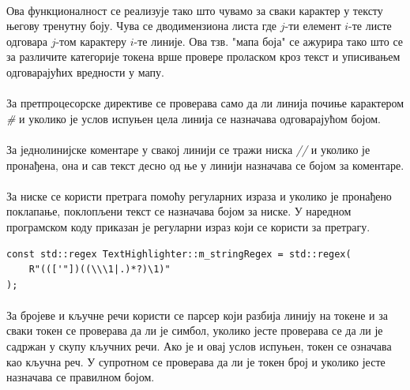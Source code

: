 \documentclass[12pt,oneside]{memoir}
\begin{document}
\paragraph{}
Ова функционалност се реализује тако што чувамо за сваки карактер у тексту његову тренутну боју. Чува се дводимензиона листа где \(j\)-ти елемент \(i\)-те
листе одговара \(j\)-том карактеру \(i\)-те линије. Ова тзв. "мапа боја" се
ажурира тако што се за различите категорије токена врше провере проласком
кроз текст и уписивањем одговарајућих вредности у мапу.

\paragraph{}
За претпроцесорске директиве се проверава само да ли линија почиње карактером
\textit{\#} и уколико је услов испуњен цела линија се назначава одговарајућом бојом.

\paragraph{}
За једнолинијске коментаре у свакој линији се тражи ниска \textit{//} и уколико
је пронађена, она и сав текст десно од ње у линији назначава се бојом за
коментаре.

\paragraph{}
За ниске се користи претрага помоћу регуларних израза и уколико је пронађено
поклапање, поклопљени текст се назначава бојом за ниске. У наредном програмском
коду приказан је регуларни израз који се користи за претрагу.

\begin{verbatim}
const std::regex TextHighlighter::m_stringRegex = std::regex(
	R"((['"])((\\\1|.)*?)\1)"
);
\end{verbatim}

\paragraph{}
За бројеве и кључне речи користи се парсер који разбија линију на токене и за 
сваки токен се проверава да ли је симбол, уколико јесте проверава се да ли је 
садржан у скупу кључних речи. Ако је и овај услов испуњен, токен се означава 
као кључна реч. У супротном се проверава да ли је токен број и уколико јесте
назначава се правилном бојом.
\end{document}
